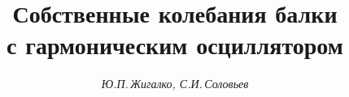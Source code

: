 

 




\newcommand{\tts}[1]{} 


 




\setcounter{page}{36} 












 


\author{\it Ю.П.\,Жигалко, С.И.\,Соловьев} 




\title{Собственные колебания балки\\ с гармоническим осциллятором} 


 


\date{} 




\pagestyle{plain} %


 




\maketitle 


\label{begin} 


 


